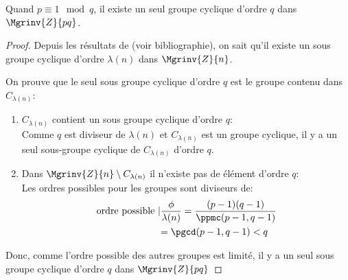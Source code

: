 		\begin{lemma}{Quand  $p \equiv 1 \mod{q}$, il existe un seul groupe cyclique d'ordre $q$ dans $\Mgrinv{Z}{pq}$.}
			\begin{proof}
				Depuis les résultats de  \cite{carmichael1914theory,Wei:wolfram:MMG} (voir bibliographie), on sait qu'il existe un sous 
				groupe cyclique d'ordre $\lambda(n)$ dans $\Mgrinv{Z}{n}$.
				
				On prouve que le seul sous groupe cyclique d'ordre $q$ est le groupe contenu dans $C_{\lambda(n)}$:
				\begin{enumerate}
					\item $C_{\lambda(n)}$ contient un sous groupe cyclique d'ordre $q$:\\
						Comme $q$ est diviseur de $\lambda(n)$ et $C_{\lambda(n)}$ est un groupe cyclique, il y a un seul 
						sous-groupe cyclique de $C_{\lambda(n)}$ d'ordre $q$.
					\item Dans $\Mgrinv{Z}{n}\setminus{C_{\lambda(n)}}$ il n'existe pas de élément d'ordre $q$:\\
						Les ordres possibles pour les groupes sont diviseurs de:
								\begin{align}
									\text{ordre possible } &| \frac{\phi}{\lambda(n)} = \frac{(p-1)(q-1)}{\ppmc(p-1,q-1)}   \nonumber\\
								 		 &= \pgcd(p-1,q-1) < q   
								\end{align}
				\end{enumerate}

				Donc, comme l'ordre possible des autres groupes est limité, il y a un seul sous groupe cyclique d'ordre $q$ dans 
				$\Mgrinv{Z}{pq}$
			\end{proof}
		\end{lemma}









